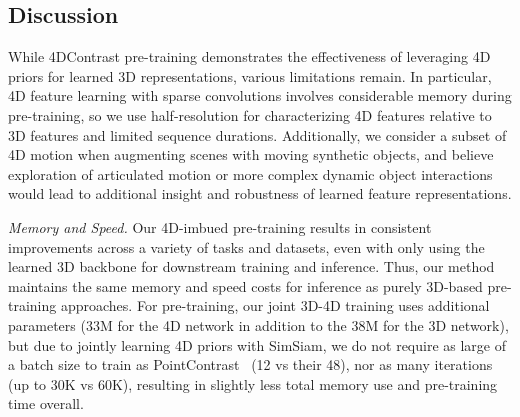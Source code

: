 \documentclass[runningheads]{llncs}
\newcommand{\OURS}{4DContrast}
\begin{document}
\begin{table}[tb]
\centering
\caption{Extended ablation of the 3d-only variant of our approach on ScanNet.}
\vspace{-0.10cm}
    \label{table:oursvs3d}
\end{table}

\subsection{Discussion}
While \OURS{} pre-training demonstrates the effectiveness of leveraging 4D priors for learned 3D representations, various limitations remain.
In particular, 4D feature learning with sparse convolutions involves considerable memory during pre-training, so we use half-resolution for characterizing 4D features relative to 3D features and limited sequence durations.
Additionally, we consider a subset of 4D motion when augmenting scenes with moving synthetic objects, and believe exploration of articulated motion or more complex dynamic object interactions would lead to additional insight and robustness of learned feature representations.

\noindent \textit{Memory and Speed.} 
Our 4D-imbued pre-training results in consistent improvements across a variety of tasks and datasets, even with only using the learned 3D backbone for downstream training and inference. 
Thus, our method maintains the same memory and speed costs for inference as purely 3D-based pre-training approaches.
For pre-training, our joint 3D-4D training uses additional parameters (33M for the 4D network in addition to the 38M for the 3D network), but due to jointly learning 4D priors with SimSiam, we do not require as large of a batch size to train as PointContrast~\cite{xie2020pointcontrast} (12 vs their 48), nor as many iterations (up to 30K vs 60K), resulting in slightly less total memory use and pre-training time overall. 
\end{document}

